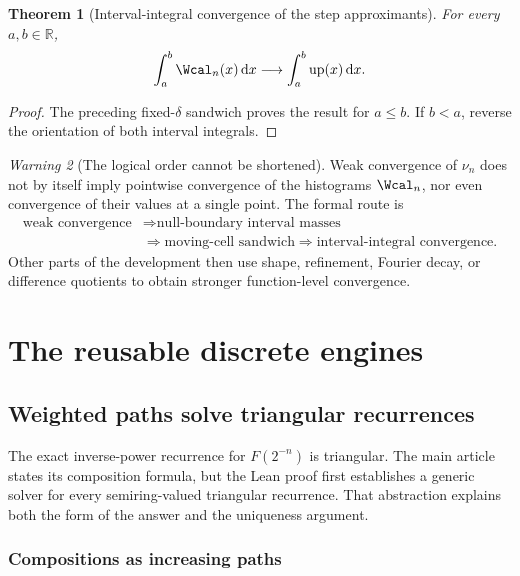 \documentclass[11pt,oneside]{article}
\newtheorem{theorem}{Theorem}[section]
\theoremstyle{definition}
\theoremstyle{remark}
\newtheorem{warning}[theorem]{Warning}
\newcommand{\R}{\mathbb R}
\newcommand{\Up}{\operatorname{up}}
\newcommand{\dd}{\,\mathrm d}
\begin{document}
\begin{theorem}[Interval-integral convergence of the step approximants]
\label{integration:thm:step-integral-convergence}
For every $a,b\in\R$,
\begin{equation}
 \int_a^b\Wcal_n(x)\dd x
 \longrightarrow
 \int_a^b\Up(x)\dd x.
 \label{integration:eq:step-integral-convergence}
\end{equation}
\end{theorem}

\begin{proof}
The preceding fixed-$\delta$ sandwich proves the result for $a\le b$.  If $b<a$, reverse the
orientation of both interval integrals.
\end{proof}

\begin{warning}[The logical order cannot be shortened]
Weak convergence of $\nu_n$ does not by itself imply pointwise convergence of the
histograms $\Wcal_n$, nor even convergence of their values at a single point.  The formal
route is
\[
\begin{aligned}
 \text{weak convergence}
 &\Longrightarrow \text{null-boundary interval masses}\\
 &\Longrightarrow \text{moving-cell sandwich}
 \Longrightarrow \text{interval-integral convergence}.
\end{aligned}
\]
Other parts of the development then use shape, refinement, Fourier decay, or difference
quotients to obtain stronger function-level convergence.
\end{warning}

\section{The reusable discrete engines}

\subsection{Weighted paths solve triangular recurrences}
\label{integration:sec:path-sums}

The exact inverse-power recurrence for $F(2^{-n})$ is triangular.  The main article states its
composition formula, but the Lean proof first establishes a generic solver for every
semiring-valued triangular recurrence.  That abstraction explains both the form of the
answer and the uniqueness argument.

\subsubsection{Compositions as increasing paths}
\end{document}
